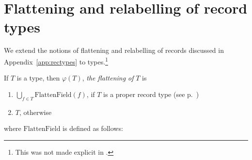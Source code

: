 



\section{Flattening and relabelling of record types}
\label{app:flattening}

We extend the notions of flattening and relabelling of records
discussed in Appendix~\ref{app:rectypes} to types.\footnote{This was
  not made explicit in \cite{Cooper2012}.}

If $T$ is a type, then $\varphi(T)$, \textit{the flattening of} $T$ is
\begin{enumerate} 
 
\item $\displaystyle{\bigcup_{f\in T}}\mathrm{FlattenField}(f)$,  if $T$ is a proper record type (see p.~\pageref{pg:proprectype}) 
 
\item $T$, otherwise 
 
\end{enumerate} 
where $\mathrm{FlattenField}$ is defined as follows:

